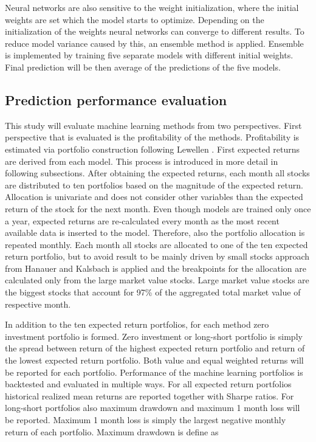 \documentclass{article}
\begin{document}
Neural networks are also sensitive to the weight initialization, where the initial weights are set which the model starts to optimize. Depending on the initialization of the weights neural networks can converge to different results. To reduce model variance caused by this, an ensemble method is applied. Ensemble is implemented by training five separate models with different initial weights. Final prediction will be then average of the predictions of the five models. \par

\subsection{Prediction performance evaluation}\label{PredictionPerformanceEvaluation}

This study will evaluate machine learning methods from two perspectives. First perspective that is evaluated is the profitability of the methods. Profitability is estimated via portfolio construction following Lewellen \citeyear{Lewellen2015}. First expected returns are derived from each model. This process is introduced in more detail in following subsections. After obtaining the expected returns, each month all stocks are distributed to ten portfolios based on the magnitude of the expected return. Allocation is univariate and does not consider other variables than the expected return of the stock for the next month. Even though models are trained only once a year, expected returns are re-calculated every month as the most recent available data is inserted to the model. Therefore, also the portfolio allocation is repeated monthly. Each month all stocks are allocated to one of the ten expected return portfolio, but to avoid result to be mainly driven by small stocks approach from Hanauer and Kalsbach is applied \citeyear{HANAUER2023}  and the breakpoints for the allocation are calculated only from the large market value stocks. Large market value stocks are the biggest stocks that account for 97\% of the aggregated total market value of respective month. \par

In addition to the ten expected return portfolios, for each method zero investment portfolio is formed. Zero investment or long-short portfolio is simply the spread between return of the highest expected return portfolio and return of the lowest expected return portfolio. Both value and equal weighted returns will be reported for each portfolio. Performance of the machine learning portfolios is backtested and evaluated in multiple ways. For all expected return portfolios historical realized mean returns are reported together with Sharpe ratios. For long-short portfolios also maximum drawdown and maximum 1 month loss will be reported. Maximum 1 month loss is simply the largest negative monthly return of each portfolio. Maximum drawdown is define as \par
\end{document}
